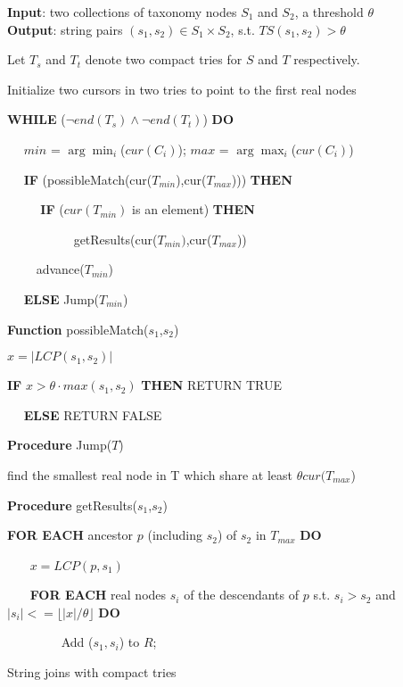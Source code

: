 \begin{algorithm}
{\bf Input}: two collections of taxonomy nodes $S_1$ and $S_2$,  a threshold $\theta$ \\
{\bf Output}: string pairs $(s_1,s_2) \in S_1 \times S_2$, s.t. $TS(s_1, s_2) > \theta$
\begin{compactenum}[(1)]
\item Let $T_s$ and $T_t$ denote two compact tries for $S$ and $T$ respectively.
\item Initialize two cursors in two tries to point to the first real nodes
\item {\bf WHILE} ($\neg end(T_s) \wedge  \neg end(T_t)$) {\bf DO}
\item  ~~ $min$ = $\arg\min_{i}$($cur(C_i)$); $max$ = $\arg\max_{i}$($cur(C_i)$)
\item  ~~ {\bf IF} (possibleMatch(cur($T_{min}$),cur($T_{max}$))) {\bf THEN}
\item ~~ ~~ {\bf  IF} ($cur(T_{min})$ is an element)  {\bf THEN}
\item ~~ ~~  ~~ ~~ getResults(cur($T_{min})$,cur($T_{max}$))
\item ~~~~ advance($T_{min}$)
\item ~~ {\bf ELSE} Jump($T_{min}$)
\end{compactenum}
\smallskip
\textbf{Function} possibleMatch($s_1$,$s_2$)
\begin{compactenum}[(1)]
\item  $x =| LCP(s_1,s_2) |$
\item {\bf IF}  $x > \theta \cdot max (s_1, s_2 )$  {\bf THEN} RETURN TRUE
\item   ~~ {\bf ELSE} RETURN FALSE
\end{compactenum}
\smallskip
\textbf{Procedure} Jump($T$)
\begin{compactenum}[(1)]
\item  find the smallest real node in T which share at least  $\theta cur( T_{max}$) 
\end{compactenum}
\smallskip
\textbf{Procedure} getResults($s_1$,$s_2$)
\begin{compactenum}[(1)]
\item  {\bf FOR EACH} ancestor $p$ (including $s_2$) of $s_2$ in  $T_{max}$ {\bf DO}
\item   ~~~ $x=LCP(p,s_1)$
\item   ~~~ {\bf FOR EACH} real nodes $s_i$ of the descendants of $p$  s.t.  $s_i > s_2$ and $|s_i| <= \lfloor |x|/ \theta \rfloor $ {\bf DO}
\item ~~~~~~~~ Add ($s_1,s_i$) to $R$;
\end{compactenum}
\caption{String joins with compact tries}
\label{alg:compactTrieJoin}
\end{algorithm}



